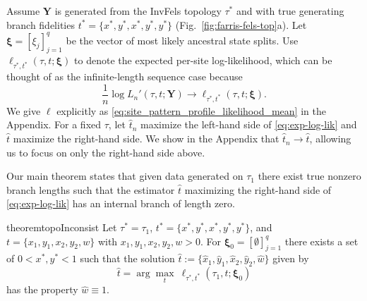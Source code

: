\documentclass[11pt]{article}
\newcommand{\fullAlignment}{\mathbf{Y}}
\newcommand{\nCols}{n}
\newcommand{\nSiteSplits}{q}
\begin{document}
Assume $\fullAlignment$ is generated from the InvFels topology $\tau^*$ and with true generating branch fidelities $t^*=\{x^*, y^*, x^*, y^*, y^*\}$ (Fig.~\ref{fig:farris-fels-top}a).
Let $\boldsymbol\xi = [\xi_j]_{j=1}^\nSiteSplits$ be the vector of most likely ancestral state splits.
Use $\ell_{\tau^*,t^*}(\tau, t; \boldsymbol\xi)$ to denote the expected per-site log-likelihood, which can be thought of as the infinite-length sequence case because
\begin{equation}
\label{eq:exp-log-lik}
\frac{1}{n}\log L_\nCols'(\tau, t; \fullAlignment) \rightarrow \ell_{\tau^*,t^*}(\tau, t; \boldsymbol\xi).
\end{equation}
We give $\ell$ explicitly as \eqref{eq:site_pattern_profile_likelihood_mean} in the Appendix.
For a fixed $\tau$, let $\hat{t}_\nCols$ maximize the left-hand side of \eqref{eq:exp-log-lik} and $\hat{t}$ maximize the right-hand side.
We show in the Appendix that $\hat{t}_\nCols \rightarrow \hat{t}$, allowing us to focus on only the right-hand side above.


Our main theorem states that given data generated on $\tau_1$ there exist true nonzero branch lengths such that the estimator $\hat{t}$ maximizing the right-hand side of \eqref{eq:exp-log-lik} has an internal branch of length zero.
\begin{restatable}{theorem}{topoInconsist}
\label{thm:main_theorem}
Let $\tau^*=\tau_1$, $t^*=\{x^*, y^*, x^*, y^*, y^*\}$, and $t=\{x_1, y_1, x_2, y_2, w\}$ with $x_1, y_1, x_2, y_2, w > 0$.
For $\boldsymbol\xi_0 = [\emptyset]_{j=1}^\nSiteSplits$ there exists a set of $0 < x^*, y^* < 1$ such that the solution $\hat{t} := \{\hat{x}_1,\hat{y}_1,\hat{x}_2,\hat{y}_2,\hat{w}\}$ given by
\[
\hat{t} = \arg\max_{t} \ \ell_{\tau^*,t^*}(\tau_1, t; \boldsymbol\xi_0)
\]
has the property $\hat{w}\equiv 1$.
\end{restatable}
\end{document}
